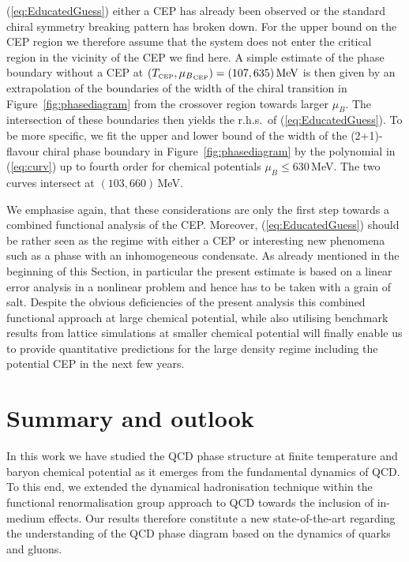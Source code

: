 \documentclass[%
reprint,
superscriptaddress,
showpacs,preprintnumbers,
 amsmath,amssymb,
 aps,
prd,
]{revtex4-1}
\def\Fig#1{Figure~\ref{#1}}
\def\eq#1{(\ref{#1})}
\begin{document}
\eq{eq:EducatedGuess} either a CEP has already been observed or the
standard chiral symmetry breaking pattern has broken down.  For the
upper bound on the CEP region we therefore assume that the system does
not enter the critical region in the vicinity of the CEP we find here.
A simple estimate of the phase boundary without a CEP at
$(T_\text{\tiny CEP},{\mu_B}_{\text{\tiny CEP}})=(107,
635)\,\text{MeV}$ is then given by an extrapolation of the boundaries
of the width of the chiral transition in \Fig{fig:phasediagram} from
the crossover region towards larger $\mu_B$. The intersection of these
boundaries then yields the r.h.s.\ of \eq{eq:EducatedGuess}. To be
more specific, we fit the upper and lower bound of the width of the
(2+1)-flavour chiral phase boundary in \Fig{fig:phasediagram} by the
polynomial in \eq{eq:curv} up to fourth order for chemical potentials
$\mu_B \leq 630$\,MeV. The two curves intersect at $(103, 660)$\,MeV.

We emphasise again, that these considerations are only the first step
towards a combined functional analysis of the CEP. Moreover,
\eq{eq:EducatedGuess} should be rather seen as the regime with either
a CEP or interesting new phenomena such as a phase with an
inhomogeneous condensate. As already mentioned in the beginning of
this Section, in particular the present estimate is based on a linear
error analysis in a nonlinear problem and hence has to be taken with
a grain of salt. Despite the obvious deficiencies of the present
analysis this combined functional approach at large chemical
potential, while also utilising benchmark results from lattice
simulations at smaller chemical potential will finally enable us to
provide quantitative predictions for the large density regime
including the potential CEP in the next few years.



\section{Summary and outlook}
\label{sec:sum}

In this work we have studied the QCD phase structure at finite
temperature and baryon chemical potential as it emerges from the
fundamental dynamics of QCD. To this end, we extended the dynamical
hadronisation technique within the functional renormalisation group
approach to QCD towards the inclusion of in-medium effects. Our
results therefore constitute a new state-of-the-art regarding the
understanding of the QCD phase diagram based on the dynamics of quarks
and gluons.
\end{document}
